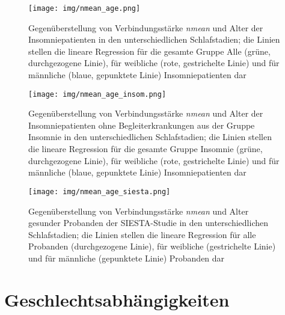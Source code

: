 \newpage

\begin{figure}[H]
	\centering
	\texttt{[image: img/nmean\_age.png]}
	\caption[Gegenüberstellung von Verbindungsstärke \textit{nmean} und Alter von Insomniepatienten]{Gegenüberstellung von Verbindungsstärke \textit{nmean} und Alter der Insomniepatienten in den unterschiedlichen Schlafstadien; die Linien stellen die lineare Regression für die gesamte Gruppe Alle (grüne, durchgezogene Linie), für weibliche (rote, gestrichelte Linie) und für männliche (blaue, gepunktete Linie) Insomniepatienten dar}
	\label{fig:nmean_age}
\end{figure}




\begin{figure}[H]
	\centering
	\texttt{[image: img/nmean\_age\_insom.png]}
	\caption[Gegenüberstellung von Verbindungsstärke \textit{nmean} und Alter von Insomniepatienten ohne Begleiterkrankungen]{Gegenüberstellung von Verbindungsstärke \textit{nmean} und Alter der Insomniepatienten ohne Begleiterkrankungen aus der Gruppe Insomnie in den unterschiedlichen Schlafstadien; die Linien stellen die lineare Regression für die gesamte Gruppe Insomnie (grüne, durchgezogene Linie), für weibliche (rote, gestrichelte Linie) und für männliche (blaue, gepunktete Linie) Insomniepatienten dar}
	\label{fig:nmean_age_insom}
\end{figure}



\begin{figure}[H]
	\centering
	\texttt{[image: img/nmean\_age\_siesta.png]}
	\caption[Gegenüberstellung von Verbindungsstärke \textit{nmean} und Alter gesunder Probanden]{Gegenüberstellung von Verbindungsstärke \textit{nmean} und Alter gesunder Probanden der SIESTA-Studie in den unterschiedlichen Schlafstadien; die Linien stellen die lineare Regression für alle Probanden (durchgezogene Linie), für weibliche (gestrichelte Linie) und für männliche (gepunktete Linie) Probanden dar}
	\label{fig:nmean_age_siesta}
\end{figure}



\section{Geschlechtsabhängigkeiten}